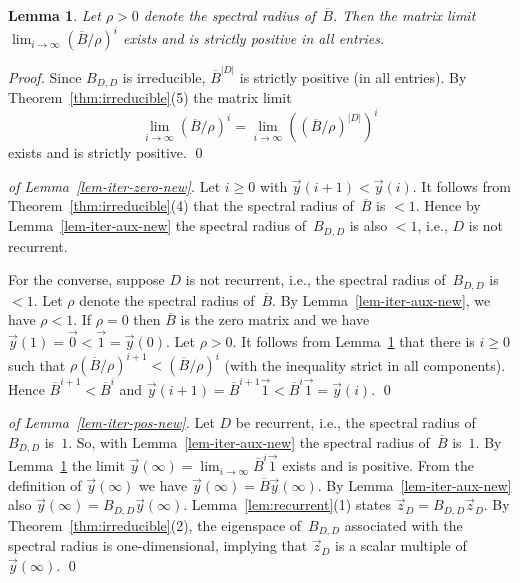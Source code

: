 \documentclass{elsarticle}
\newtheorem{lemma}[definition]{Lemma}
\newcommand{\vzero}{\vec{0}}\newcommand{\vone}{\vec{1}}\newcommand{\tB}{\overline{B}}
\begin{document}
\begin{lemma} \label{lem-iter-matrix-conv-new}
Let $\rho > 0$ denote the spectral radius of~$\tB$.
Then the matrix limit $\lim_{i \to \infty} \left( \tB / \rho \right)^i$ exists and is strictly positive in all entries.
\end{lemma}
\begin{proof}
Since $B_{D,D}$ is irreducible, $\tB^{|D|}$ is strictly positive (in all entries).
By Theorem~\ref{thm:irreducible}(5) the matrix limit
 \[
  \lim_{i \to \infty} \left(\tB/\rho\right)^i = \lim_{i \to \infty}
  \left(\left(\tB/\rho\right)^{|D|}\right)^i
 \]
 exists and is strictly positive.
\qed
\end{proof}

\begin{proof}[of Lemma~\ref{lem-iter-zero-new}]
Let $i \geqslant 0$ with $\vec{y}(i+1) < \vec{y}(i)$.
It follows from Theorem~\ref{thm:irreducible}(4) that the spectral radius of~$\tB$ is $<1$.
Hence by Lemma~\ref{lem-iter-aux-new} the spectral radius of~$B_{D,D}$ is also $<1$, i.e., $D$ is not recurrent.

For the converse, suppose $D$ is not recurrent, i.e., the spectral radius of~$B_{D,D}$ is $<1$.
Let $\rho$ denote the spectral radius of~$\tB$.
By Lemma~\ref{lem-iter-aux-new}, we have $\rho < 1$.
If $\rho = 0$ then $\tB$ is the zero matrix and we have $\vec{y}(1) = \vzero <
\vone = \vec{y}(0)$.
Let $\rho > 0$.
It follows from Lemma~\ref{lem-iter-matrix-conv-new} that there is $i \geqslant 0$ such
that $\rho \left(\tB/\rho\right)^{i+1} < \left(\tB/\rho\right)^i$ (with the inequality strict in all components).
Hence $\tB^{i+1} < \tB^i$ and $\vec{y}(i+1) = \tB^{i+1} \vone < \tB^i \vone =
\vec{y}(i)$.
\qed
\end{proof}

\begin{proof}[of Lemma~\ref{lem-iter-pos-new}]
Let $D$ be recurrent, i.e., the spectral radius of~$B_{D,D}$ is~$1$.
So, with Lemma~\ref{lem-iter-aux-new} the spectral radius of~$\tB$ is~$1$.
By Lemma~\ref{lem-iter-matrix-conv-new} the limit $\vec{y}(\infty) = \lim_{i \to \infty}
\tB^i \vone$ exists and is positive.
From the definition of $\vec{y}(\infty)$ we have $\vec{y}(\infty) = \tB \vec{y}(\infty)$.
By Lemma~\ref{lem-iter-aux-new} also $\vec{y}(\infty) = B_{D,D} \vec{y}(\infty)$.
Lemma~\ref{lem:recurrent}(1) states $\vec{z}_D = B_{D,D} \vec{z}_D$.
By Theorem~\ref{thm:irreducible}(2), the eigenspace
of~$B_{D,D}$ associated with the spectral radius is one-dimensional, implying that $\vec{z}_D$ is a scalar multiple of~$\vec{y}(\infty)$.
\qed
\end{proof}
\end{document}
